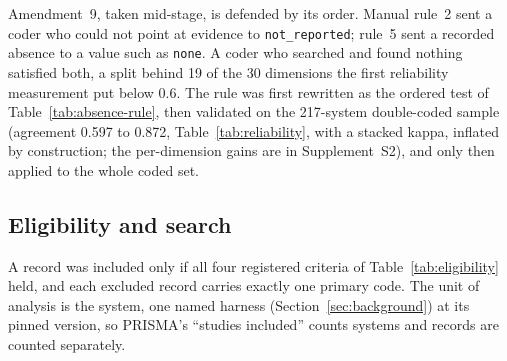 Amendment~9, taken mid-stage, is defended by its order. Manual rule~2 sent a coder who
could not point at evidence to \texttt{not\_reported}; rule~5 sent a recorded absence to a value such as
\texttt{none}. A coder who searched and found nothing satisfied both, a split behind 19 of the 30
dimensions the first reliability measurement put below 0.6. The rule was first rewritten as the ordered
test of Table~\ref{tab:absence-rule}, then validated on the 217-system double-coded sample (agreement
0.597 to 0.872, Table~\ref{tab:reliability}, with a stacked kappa, inflated by construction; the
per-dimension gains are in Supplement~S2), and only then applied to the whole coded set.

\subsection{Eligibility and search}\label{subsec:eligibility}\label{subsec:sources}

A record was included only if all four registered criteria of Table~\ref{tab:eligibility} held, and each
excluded record carries exactly one primary code. The unit of analysis is the system, one named harness
(Section~\ref{sec:background}) at its pinned version, so PRISMA's ``studies included'' counts systems and records are counted separately.

